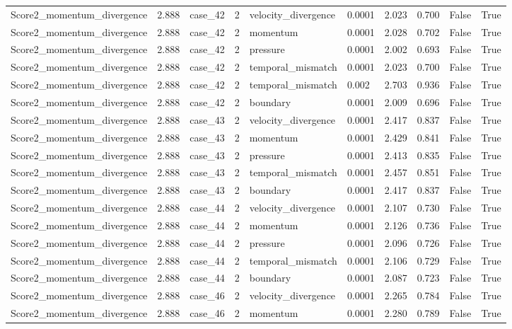 \begin{longtable}{llllllllll}
Score2\_momentum\_divergence & 2.888 & case\_42 & 2 & velocity\_divergence & 0.0001 & 2.023 & 0.700 & False & True \\
Score2\_momentum\_divergence & 2.888 & case\_42 & 2 & momentum & 0.0001 & 2.028 & 0.702 & False & True \\
Score2\_momentum\_divergence & 2.888 & case\_42 & 2 & pressure & 0.0001 & 2.002 & 0.693 & False & True \\
Score2\_momentum\_divergence & 2.888 & case\_42 & 2 & temporal\_mismatch & 0.0001 & 2.023 & 0.700 & False & True \\
Score2\_momentum\_divergence & 2.888 & case\_42 & 2 & temporal\_mismatch & 0.002 & 2.703 & 0.936 & False & True \\
Score2\_momentum\_divergence & 2.888 & case\_42 & 2 & boundary & 0.0001 & 2.009 & 0.696 & False & True \\
Score2\_momentum\_divergence & 2.888 & case\_43 & 2 & velocity\_divergence & 0.0001 & 2.417 & 0.837 & False & True \\
Score2\_momentum\_divergence & 2.888 & case\_43 & 2 & momentum & 0.0001 & 2.429 & 0.841 & False & True \\
Score2\_momentum\_divergence & 2.888 & case\_43 & 2 & pressure & 0.0001 & 2.413 & 0.835 & False & True \\
Score2\_momentum\_divergence & 2.888 & case\_43 & 2 & temporal\_mismatch & 0.0001 & 2.457 & 0.851 & False & True \\
Score2\_momentum\_divergence & 2.888 & case\_43 & 2 & boundary & 0.0001 & 2.417 & 0.837 & False & True \\
Score2\_momentum\_divergence & 2.888 & case\_44 & 2 & velocity\_divergence & 0.0001 & 2.107 & 0.730 & False & True \\
Score2\_momentum\_divergence & 2.888 & case\_44 & 2 & momentum & 0.0001 & 2.126 & 0.736 & False & True \\
Score2\_momentum\_divergence & 2.888 & case\_44 & 2 & pressure & 0.0001 & 2.096 & 0.726 & False & True \\
Score2\_momentum\_divergence & 2.888 & case\_44 & 2 & temporal\_mismatch & 0.0001 & 2.106 & 0.729 & False & True \\
Score2\_momentum\_divergence & 2.888 & case\_44 & 2 & boundary & 0.0001 & 2.087 & 0.723 & False & True \\
Score2\_momentum\_divergence & 2.888 & case\_46 & 2 & velocity\_divergence & 0.0001 & 2.265 & 0.784 & False & True \\
Score2\_momentum\_divergence & 2.888 & case\_46 & 2 & momentum & 0.0001 & 2.280 & 0.789 & False & True \\

\end{longtable}
